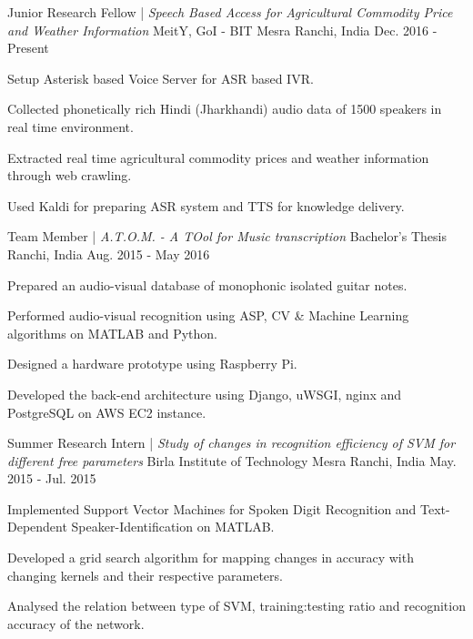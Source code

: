 \vspace{-1em}
\begin{cventries}
  \cventry
  {Junior Research Fellow | \textit{Speech Based Access for Agricultural Commodity Price and Weather Information}}
  {MeitY, GoI - BIT Mesra}
  {Ranchi, India}
  {Dec. 2016 - Present}
  { \begin{cvitems}  		
		\item {Setup Asterisk based Voice Server for ASR based IVR.}
  		\item {Collected phonetically rich Hindi (Jharkhandi) audio data of 1500 speakers in real time environment.}
		\item {Extracted real time agricultural commodity prices and weather information through web crawling.}  		
  		\item {Used Kaldi for preparing ASR system and TTS for knowledge delivery.}
  	\end{cvitems}
  }	
    
  \cventry
  {Team Member | \textit{A.T.O.M. - A TOol for Music transcription}}
  {Bachelor's Thesis}
  {Ranchi, India}
  {Aug. 2015 - May 2016} 
  { \begin{cvitems}
     \item {Prepared an audio-visual database of monophonic isolated guitar notes.}
     \item {Performed audio-visual recognition using ASP, CV \& Machine Learning algorithms on MATLAB and Python.}
     \item {Designed a hardware prototype using Raspberry Pi.}
     \item {Developed the back-end architecture using Django, uWSGI, nginx and PostgreSQL on AWS EC2 instance.}
    \end{cvitems}
  } 
    
  \cventry
    {Summer Research Intern | \textit{Study of changes in recognition efficiency of SVM for different free parameters}}
    {Birla Institute of Technology Mesra}
    {Ranchi, India}
    {May. 2015 - Jul. 2015}    
    {
      \begin{cvitems}
        \item {Implemented Support Vector Machines for Spoken Digit Recognition and Text-Dependent Speaker-Identification on MATLAB.}
        \item {Developed a grid search algorithm for mapping changes in accuracy with changing kernels and their respective parameters.}
        \item {Analysed the relation between type of SVM, training:testing ratio and recognition accuracy of the network.}
      \end{cvitems}
    }


\end{cventries}
